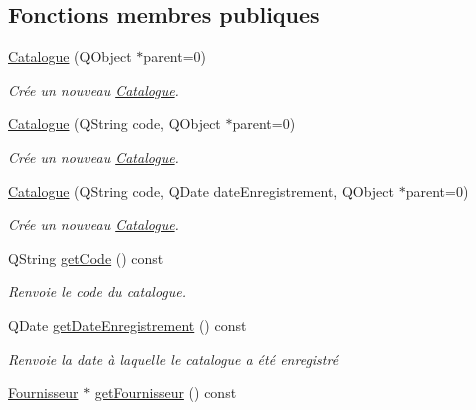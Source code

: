 \subsection*{Fonctions membres publiques}
\begin{DoxyCompactItemize}
\item 
\hyperlink{class_core_1_1_catalogue_a1563d794f593a4978785d4e784628123}{Catalogue} (QObject $\ast$parent=0)
\begin{DoxyCompactList}\small\item\em Crée un nouveau \hyperlink{class_core_1_1_catalogue}{Catalogue}. \item\end{DoxyCompactList}\item 
\hyperlink{class_core_1_1_catalogue_a56f8f6931050a2592ebc2b2cb3f5ef1d}{Catalogue} (QString code, QObject $\ast$parent=0)
\begin{DoxyCompactList}\small\item\em Crée un nouveau \hyperlink{class_core_1_1_catalogue}{Catalogue}. \item\end{DoxyCompactList}\item 
\hyperlink{class_core_1_1_catalogue_a5a96958fe38e82024175a2dbb40d7d29}{Catalogue} (QString code, QDate dateEnregistrement, QObject $\ast$parent=0)
\begin{DoxyCompactList}\small\item\em Crée un nouveau \hyperlink{class_core_1_1_catalogue}{Catalogue}. \item\end{DoxyCompactList}\item 
QString \hyperlink{class_core_1_1_catalogue_a6dcea2e7862042cd9f05dae894d47a7c}{getCode} () const 
\begin{DoxyCompactList}\small\item\em Renvoie le code du catalogue. \item\end{DoxyCompactList}\item 
QDate \hyperlink{class_core_1_1_catalogue_ac60f6d1630d03598e313ba497ab18f56}{getDateEnregistrement} () const 
\begin{DoxyCompactList}\small\item\em Renvoie la date à laquelle le catalogue a été enregistré \item\end{DoxyCompactList}\item 
\hyperlink{class_core_1_1_fournisseur}{Fournisseur} $\ast$ \hyperlink{class_core_1_1_catalogue_aa8d603a01cab36e2be56a2f10219b56c}{getFournisseur} () const 

\end{DoxyCompactItemize}
